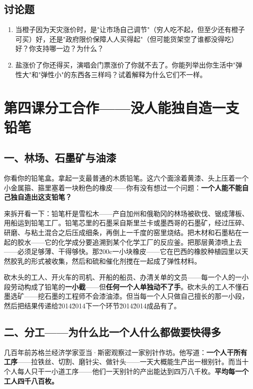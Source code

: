 \documentclass[a4paper,12pt]{ctexart}
\begin{document}
\subsection*{讨论题}
\begin{enumerate}
  \item 当橙子因为天灾涨价时，是"让市场自己调节"（穷人吃不起，但至少还有橙子可买）好，还是"政府限价保障人人买得起"（但可能货架空了谁都没得吃）好？你支持哪一边？为什么？
  \item 盐涨价了你还得买，演唱会门票涨价了你就不去了。你能列举出你生活中"弹性大"和"弹性小"的东西各三样吗？试着解释为什么它们不一样。
\end{enumerate}

\newpage
\section{\textcolor{orange!80!black}{第四课\quad 分工合作——没人能独自造一支铅笔}}

\subsection*{一、林场、石墨矿与油漆}

你看你的铅笔盒。拿起一支最普通的木质铅笔。这六个面涂着黄漆、头上压着一个小金属箍、箍里塞着一块粉色的橡皮——你有没有想过一个问题：\textbf{一个人能不能自己独自造出这支铅笔？}

来拆开看一下：铅笔杆是雪松木——产自加州和俄勒冈的林场被砍伐、锯成薄板、用船运到铅笔工厂。铅笔芯里的石墨采自斯里兰卡或墨西哥的石墨矿，经过压碎、研磨、与粘土混合之后压成细条，再倒上一千度的窑里烧结。把木材和石墨粘在一起的胶水——它的化学成分要追溯到某个化学工厂的反应釜。把那层黄漆喷上去——必须足够薄、干得够快。那\u200c一小块橡皮——它在巴西的橡胶种植园里以天然胶乳的形式被收集，然后和硫和催化剂搅在一起成了弹性材料。

砍木头的工人、开火车的司机、开船的船员、办清关单的文员——每一个人的一小段劳动构成了铅笔的\textbf{一小截}——但\textbf{任何一个人单独动不了手}。砍木头的工人不懂石墨选矿——挖石墨的工程师不会漆油漆。但当每一个人只做自己擅长的那一小段，然后把结果传递给\u2014\u2014下一个环节\u2014\u2014成品有了。

\subsection*{二、分工——为什么比一个人什么都做要快得多}

几百年前苏格兰经济学家亚当·斯密观察过一家别针作坊。他写道：\textbf{一个人干所有工序}——拉铁丝、切割、磨针尖、做针头——一天大概能生产出一根别针。而当十个人每人只干一小道工序——他们一天别针的产出能达到四万八千枚。\textbf{平均每一个工人四千八百枚。}
\end{document}
